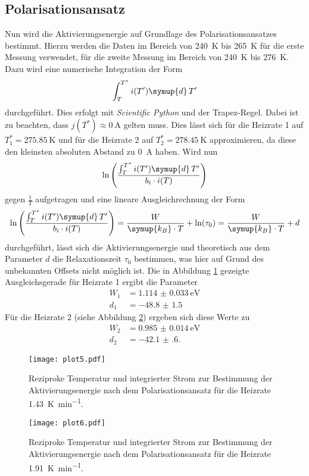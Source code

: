 \subsection{Polarisationsansatz}
\label{sec:grT}
Nun wird die Aktivierungsenergie auf Grundlage des Polarisationsansatzes bestimmt.
Hierzu werden die Daten im Bereich von \SI{240}{\kelvin} bis \SI{265}{\kelvin} für die erste Messung verwendet, für die zweite Messung im Bereich von \SI{240}{\kelvin} bis \SI{276}{\kelvin}.
Dazu wird eine numerische Integration der Form
\begin{equation}
    \label{eqn:int}
    \int_T^{T^*} i(T') \symup{d}\,T'
\end{equation}
durchgeführt.
Dies erfolgt mit \textit{Scientific Python} \cite{scipy} und der Trapez-Regel.
Dabei ist zu beachten, dass $j(T^*) \approx \SI{0}{\ampere}$ gelten muss.
Dies lässt sich für die Heizrate 1 auf $T^*_1 = \SI{275.85}{\kelvin}$ und für die Heizrate 2 auf $T^*_2 = \SI{278.45}{\kelvin}$ approximieren, da diese den kleinsten absoluten Abstand zu \SI{0}{\ampere} haben.
Wird nun
\begin{equation*}
    \ln\left(\frac{\int_T^{T^*} i(T') \symup{d}\,T'}{b_i \cdot i(T)}\right)
\end{equation*}
gegen $\frac{1}{T}$ aufgetragen und eine lineare Ausgleichrechnung der Form
\begin{equation}
    \label{eqn:lin2}
    \ln\left(\frac{\int_T^{T^*} i(T') \symup{d}\,T'}{b_i \cdot i(T)}\right) = \frac{W}{\symup{k_B} \cdot T} + \ln(\tau_0) = \frac{W}{\symup{k_B} \cdot T} + d
\end{equation}
durchgeführt, lässt sich die Aktivierungsenergie und theoretisch aus dem Parameter $d$ die Relaxationszeit $\tau_0$ bestimmen, was hier auf Grund des unbekannten Offsets nicht möglich ist.
Die in Abbildung \ref{fig:plot5} gezeigte Ausgleichsgerade für Heizrate 1 ergibt die Parameter
\begin{align*}
    W_1 &= \SI{1.114(33)}{\electronvolt} \\
    d_1 &= \num{-48.8(15)}
\end{align*}
Für die Heizrate 2 (siehe Abbildung \ref{fig:plot6}) ergeben sich diese Werte zu
\begin{align*}
    W_2 &= \SI{0.985(14)}{\electronvolt} \\
    d_2 &= \num{-42.1(6)}.
\end{align*}

\begin{figure}
  \centering
  \texttt{[image: plot5.pdf]}
  \caption{Reziproke Temperatur und integrierter Strom zur Bestimmung der Aktivierungsenergie nach dem Polarisationsansatz für die Heizrate \SI{1.43}{\kelvin\per\minute}.}
  \label{fig:plot5}
\end{figure}
\begin{figure}
  \centering
  \texttt{[image: plot6.pdf]}
  \caption{Reziproke Temperatur und integrierter Strom zur Bestimmung der Aktivierungsenergie nach dem Polarisationsansatz für die Heizrate \SI{1.91}{\kelvin\per\minute}.}
  \label{fig:plot6}
\end{figure}
\FloatBarrier

